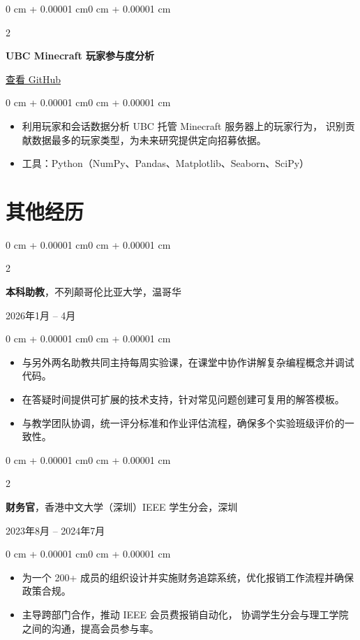 \documentclass[10pt, letterpaper]{article}
\newenvironment{highlights}{
    \begin{itemize}[
        topsep=0.10 cm,
        parsep=0.10 cm,
        partopsep=0pt,
        itemsep=0pt,
        leftmargin=0 cm + 10pt
    ]
}{
    \end{itemize}
}
\newenvironment{onecolentry}{
    \begin{adjustwidth}{0 cm + 0.00001 cm}{0 cm + 0.00001 cm}
}{
    \end{adjustwidth}
}
\newenvironment{twocolentry}[2][]{
    \onecolentry
    \def\secondColumn{#2}
    \setcolumnwidth{\fill, 4.5 cm}
    \begin{paracol}{2}
}{
    \switchcolumn \raggedleft \secondColumn
    \end{paracol}
    \endonecolentry
}
\begin{document}
    \vspace{0.2 cm}

    \begin{twocolentry}{\href{https://github.com/DavidHua04/Minecraft-Player-Engagement-Analysis}{查看 GitHub}}
        \textbf{UBC Minecraft 玩家参与度分析}
    \end{twocolentry}

    \vspace{0.10 cm}
    \begin{onecolentry}
        \begin{highlights}
            \item 利用玩家和会话数据分析 UBC 托管 Minecraft 服务器上的玩家行为，
            识别贡献数据最多的玩家类型，为未来研究提供定向招募依据。
            \item 工具：Python（NumPy、Pandas、Matplotlib、Seaborn、SciPy）
        \end{highlights}
    \end{onecolentry}

    \section{其他经历}

    \begin{twocolentry}{2026年1月 -- 4月}
        \textbf{本科助教}，不列颠哥伦比亚大学，温哥华
    \end{twocolentry}

    \vspace{0.10 cm}
    \begin{onecolentry}
        \begin{highlights}
            \item 与另外两名助教共同主持每周实验课，在课堂中协作讲解复杂编程概念并调试代码。
            \item 在答疑时间提供可扩展的技术支持，针对常见问题创建可复用的解答模板。
            \item 与教学团队协调，统一评分标准和作业评估流程，确保多个实验班级评价的一致性。
        \end{highlights}
    \end{onecolentry}

    \vspace{0.20 cm}

    \begin{twocolentry}{2023年8月 -- 2024年7月}
        \textbf{财务官}，香港中文大学（深圳）IEEE 学生分会，深圳
    \end{twocolentry}

    \vspace{0.10 cm}
    \begin{onecolentry}
        \begin{highlights}
            \item 为一个 200+ 成员的组织设计并实施财务追踪系统，优化报销工作流程并确保政策合规。
            \item 主导跨部门合作，推动 IEEE 会员费报销自动化，
            协调学生分会与理工学院之间的沟通，提高会员参与率。
        \end{highlights}
    \end{onecolentry}
\end{document}
